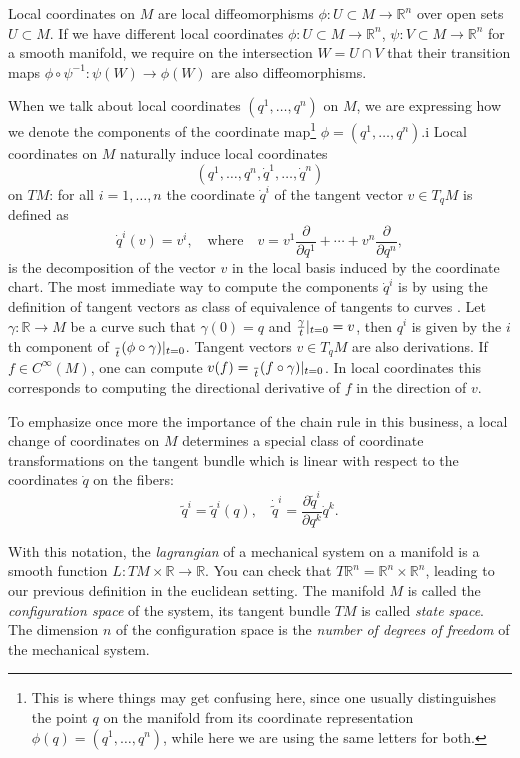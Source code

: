 \documentclass[english,fontsize=11pt,paper=a5,oneside]{scrbook}
\newcommand{\R}{\mathbb{R}}
\let\d\relax
\newcommand{\d}{\mathrm{d}}
\newcommand{\der}[2]{\frac{\d{#1}}{\d{#2}}}
\theoremstyle{definition}
\begin{document}
Local coordinates on $M$ are local diffeomorphisms $\phi:U\subset M\to \R^n$ over open sets $U\subset M$. If we have different local coordinates $\phi:U\subset M\to\R^n$, $\psi:V\subset M\to\R^n$ for a smooth manifold, we require on the intersection $W=U\cap V$ that their transition maps $\phi\circ\psi^{-1}:\psi(W)\to\phi(W)$ are also diffeomorphisms.

When we talk about local coordinates $(q^1,\ldots,q^n)$ on $M$, we are expressing how we denote the components of the coordinate map\footnote{This is where things may get confusing here, since one usually distinguishes the point $q$ on the manifold from its coordinate representation $\phi(q)=(q^1, \ldots, q^n)$, while here we are using the same letters for both.} $\phi=(q^1, \ldots, q^n)$.i
Local coordinates on $M$ naturally induce local coordinates \[(q^1,\ldots,q^n,\dot q^1, \ldots,\dot q^n)\] on $TM$: for all $i=1,\ldots,n$ the coordinate $\dot q^i$ of the tangent vector $v\in T_qM$ is defined as
\begin{equation}
  \dot q^i(v) = v^i,\quad\mbox{where}\quad v = v^1\frac{\partial}{\partial q^1}+\cdots+v^n \frac{\partial}{\partial q^n},
\end{equation}
is the decomposition of the vector $v$ in the local basis induced by the coordinate chart.
The most immediate way to compute the components $\dot q^i$ is by using the definition of tangent vectors as class of equivalence of tangents to curves \cite[Chapter 2.5]{lectures:aom:seri}.
Let $\gamma:\R \to M$ be a curve such that $\gamma(0) = q$ and $\der{\gamma}{t}|_{t=0} = v$, then $q^i$ is given by the $i$th component of $\der{}{t}(\phi\circ\gamma)|_{t=0}$.
Tangent vectors $v\in T_qM$ are also derivations. If $f\in C^\infty(M)$, one can compute $v(f)=\der{}{t}(f\circ\gamma)|_{t=0}$. In local coordinates this corresponds to computing the directional derivative of $f$ in the direction of $v$.

To emphasize once more the importance of the chain rule in this business, a local change of coordinates on $M$ determines a special class of coordinate transformations on the tangent bundle which is linear with respect to the coordinates $\dot q$ on the fibers:
\begin{equation}
  \widetilde q^i = \widetilde q^i (q), \quad \dot{\widetilde q}^i = \frac{\partial\widetilde q^i}{\partial q^k}\dot q^k.
\end{equation}

With this notation, the \emph{lagrangian} of a mechanical system on a manifold is a smooth function $L : TM\times\R \to \R$.
You can check that $T\R^n = \R^n \times \R^n$, leading to our previous definition in the euclidean setting.
The manifold $M$ is called the \emph{configuration space} of the system, its tangent bundle $TM$ is called \emph{state space}. The dimension $n$ of the configuration space is the \emph{number of degrees of freedom} of the mechanical system.
\end{document}
